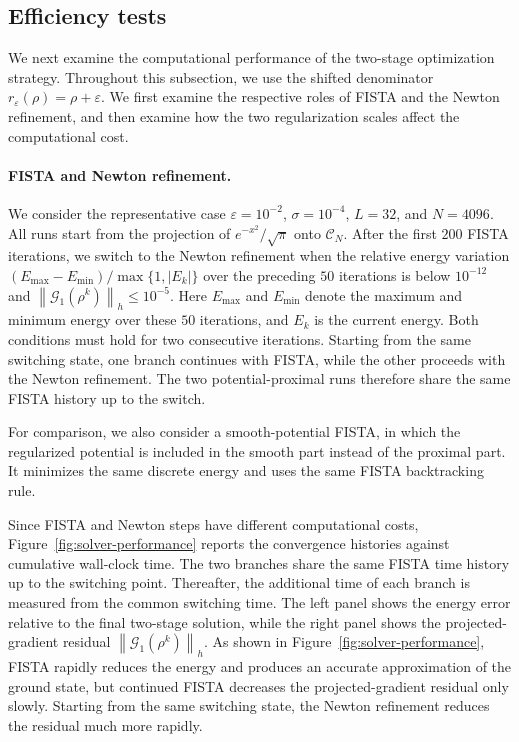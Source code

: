 \documentclass[11pt]{article}
\newcommand{\CN}{\mathcal{C}_N}
\newcommand{\eps}{\varepsilon}
\newcommand{\sig}{\sigma}
\newcommand{\norm}[1]{\left\|#1\right\|}
\theoremstyle{plain}
\theoremstyle{definition}
\numberwithin{equation}{section}
\begin{document}
\subsection{Efficiency tests}
\label{subsec:num-solver}

We next examine the computational performance of the two-stage
optimization strategy. Throughout this subsection, we use the shifted
denominator $r_\eps(\rho)=\rho+\eps$. We first examine the
respective roles of FISTA and the Newton refinement, and then
examine how the two regularization scales affect the computational
cost.

\paragraph{FISTA and Newton refinement.}

We consider the representative case
$\eps=10^{-2}$, $\sig=10^{-4}$, $L=32$, and $N=4096$.
All runs start from the projection of $e^{-x^2}/\sqrt{\pi}$ onto
$\CN$. 
After the first $200$ FISTA iterations, we switch to the Newton
refinement when the relative energy variation
$(E_{\max}-E_{\min})/\max\{1,|E_k|\}$ over the preceding $50$
iterations is below $10^{-12}$ and
$\norm{\mathcal G_1(\rho^k)}_h\le10^{-5}$.
Here $E_{\max}$ and $E_{\min}$ denote the maximum and minimum energy
over these $50$ iterations, and $E_k$ is the current energy.
Both conditions must hold for two consecutive iterations. 
Starting from
the same switching state, one branch continues with FISTA, while the other
proceeds with the Newton refinement. The two potential-proximal runs
therefore share the same FISTA history up to the switch.

For comparison, we also consider a smooth-potential FISTA, in which
the regularized potential is included in the smooth part instead of the proximal part. 
It minimizes the same
discrete energy and uses the same FISTA backtracking rule.

Since FISTA and Newton steps have different computational costs,
Figure~\ref{fig:solver-performance} reports the convergence histories
against cumulative wall-clock time. 
The two branches share the same FISTA time history up to the switching
point. Thereafter, the additional time of each branch is measured from
the common switching time.
The left panel shows the energy error
relative to the final two-stage solution, while the right panel shows
the projected-gradient residual $\norm{\mathcal G_1(\rho^k)}_h$. 
As shown in Figure~\ref{fig:solver-performance}, FISTA rapidly reduces
the energy and produces an accurate approximation of the ground state,
but continued FISTA decreases the projected-gradient residual only
slowly. Starting from the same switching state, the Newton refinement
reduces the residual much more rapidly.
\end{document}
